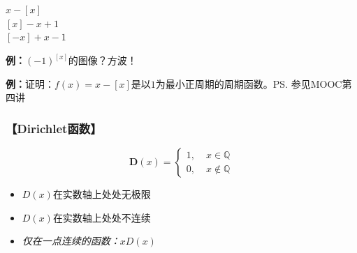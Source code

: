 \begin{center}
	\quad $x-[x]$\\

	\quad $[x]-x+1$\\

	\quad $[-x]+x-1$
\end{center}
	
{\bf 例：}$(-1)^{[x]}$的图像？方波！

{\bf 例：}证明：$f(x)=x-[x]$是以$1$为最小正周期的周期函数。\ps{参见MOOC第四讲}

\subsubsection{\bf 【Dirichlet函数】}
  $$\bm{D}(x) =\left\{
  \begin{array}{ll}
  	1,\;& x\in\mathbb{Q} \\
  	0,\;& x\notin\mathbb{Q}
  \end{array}
  \right.$$
  \begin{itemize}
    \item $D(x)$在实数轴上处处无极限
	\item $D(x)$在实数轴上处处不连续
	\item {\it 仅在一点连续的函数：}$xD(x)$
  \end{itemize}

